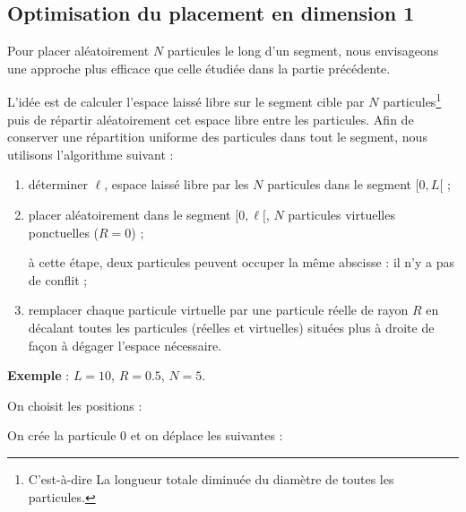 \subsection{Optimisation du placement en dimension 1}
Pour placer aléatoirement $N$ particules le long d'un segment, nous envisageons une approche plus efficace que celle étudiée dans la partie précédente.

L'idée est de calculer l'espace laissé libre sur le segment cible par $N$ particules\footnote{C'est-à-dire La longueur totale diminuée du diamètre de toutes les particules.}  puis de répartir aléatoirement cet espace libre entre les particules. Afin de conserver une répartition uniforme des particules dans tout le segment, nous utilisons l'algorithme suivant :
\begin{enumerate}
\item déterminer $\ell$, espace laissé libre par les $N$ particules
dans le segment $[0, L[$ ;

\item placer aléatoirement dans le segment $[0, \ell[$, $N$
particules virtuelles ponctuelles ($R=0$) ; 

à cette étape, deux particules peuvent occuper la même abscisse : il n'y a
pas de conflit ;

\item remplacer chaque particule virtuelle par une particule réelle de
rayon $R$ en décalant toutes les particules (réelles et virtuelles)
situées plus à droite de façon à dégager l'espace nécessaire.
\end{enumerate}

\medskip

{\bf Exemple} : $L = 10$, $R = 0.5$, $N = 5$.


On choisit les positions : 
\begin{center}
\end{center}

On crée la particule 0 et on déplace les suivantes :
\begin{center}
\end{center}

